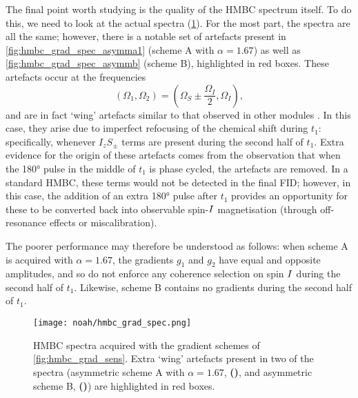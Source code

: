 The final point worth studying is the quality of the HMBC spectrum itself.
To do this, we need to look at the actual spectra (\cref{fig:hmbc_grad_spec}).
For the most part, the spectra are all the same; however, there is a notable set of artefacts present in \cref{fig:hmbc_grad_spec_asymma1} (scheme A with $\alpha = 1.67$) as well as \cref{fig:hmbc_grad_spec_asymmb} (scheme B), highlighted in red boxes.
These artefacts occur at the frequencies
\begin{equation}
    \label{eq:hmbc_wing_artefacts}
    (\Omega_1, \Omega_2) = \left(\Omega_S \pm \frac{\Omega_I}{2}, \Omega_I\right),
\end{equation}
and are in fact `wing' artefacts similar to that observed in other modules .
In this case, they arise due to imperfect refocusing of the \proton{} chemical shift during $t_1$: specifically, whenever $I_zS_\pm$ terms are present during the second half of $t_1$.
Extra evidence for the origin of these artefacts comes from the observation that when the \ang{180} pulse in the middle of $t_1$ is phase cycled, the artefacts are removed.
In a standard HMBC, these terms would not be detected in the final FID; however, in this case, the addition of an extra \ang{180} pulse after $t_1$ provides an opportunity for these to be converted back into observable spin-$I\/$ magnetisation (through off-resonance effects or miscalibration).

The poorer performance may therefore be understood as follows:
when scheme A is acquired with $\alpha = 1.67$, the gradients $g_1$ and $g_2$ have equal and opposite amplitudes, and so do not enforce any coherence selection on spin $I\/$ during the second half of $t_1$.
Likewise, scheme B contains no gradients during the second half of $t_1$.

\begin{figure}[htb]
    \centering
    \texttt{[image: noah/hmbc\_grad\_spec.png]}%
    {\label{fig:hmbc_grad_spec_symm}}%
    {\label{fig:hmbc_grad_spec_asymma1}}%
    {\label{fig:hmbc_grad_spec_asymma2}}%
    {\label{fig:hmbc_grad_spec_asymma3}}%
    {\label{fig:hmbc_grad_spec_asymmb}}%
    {\label{fig:hmbc_grad_spec_asymmc}}%
    \caption[HMBC spectra acquired with different gradient schemes]{
        HMBC spectra acquired with the gradient schemes of \cref{fig:hmbc_grad_sens}.
        Extra `wing' artefacts present in two of the spectra (asymmetric scheme A with $\alpha = 1.67$, \textbf{()}, and asymmetric scheme B, \textbf{()}) are highlighted in red boxes.
    }
    \label{fig:hmbc_grad_spec}
\end{figure}

